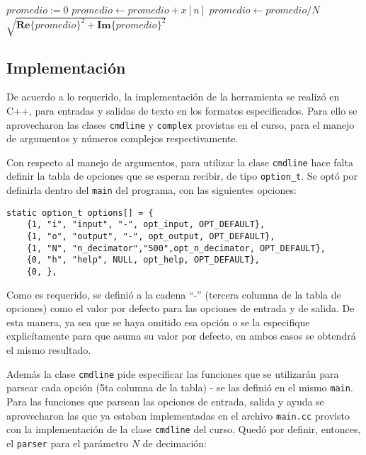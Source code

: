 	\begin{algorithmic}[H] %

	
			\State $promedio := 0$
				\State $promedio \gets promedio + x[n]$
			\EndFor
			\State $promedio \gets promedio / N$
			\Return $\sqrt{\mathbf{Re}\{promedio\}^2 + \mathbf{Im}\{promedio\}^2}$ 
		\EndWhile
	\end{algorithmic}

\newpage

\subsection{Implementación}
 De acuerdo a lo requerido, la implementación de la herramienta se realizó en C++, para entradas y salidas de texto en los formatos especificados. Para ello se aprovecharon las clases \texttt{cmdline} y \texttt{complex} provistas en el curso, para el manejo de argumentos y números complejos respectivamente.

 Con respecto al manejo de argumentos, para utilizar la clase \texttt{cmdline} hace falta definir la tabla de opciones que se esperan recibir, de tipo \texttt{option\_t}. Se optó por definirla dentro del \texttt{main} del programa, con las siguientes opciones:

\lstset{language=C++}
\begin{lstlisting}[frame=single]
static option_t options[] = {
	{1, "i", "input", "-", opt_input, OPT_DEFAULT},
	{1, "o", "output", "-", opt_output, OPT_DEFAULT},
	{1, "N", "n_decimator","500",opt_n_decimator, OPT_DEFAULT},
	{0, "h", "help", NULL, opt_help, OPT_DEFAULT},
	{0, },
\end{lstlisting}

Como es requerido, se definió a la cadena ``-'' (tercera columna de la tabla de opciones) como el valor por defecto para las opciones de entrada y de salida. De esta manera, ya sea que se haya omitido esa opción o se la especifique explicítamente para que asuma su valor por defecto, en ambos casos se  obtendrá el mismo resultado.

Además la clase \texttt{cmdline} pide especificar las funciones que se utilizarán para parsear cada opción (5ta columna de la tabla) - se las definió en el mismo \texttt{main}. Para las funciones que parsean las opciones de entrada, salida y ayuda se aprovecharon las que ya estaban implementadas en el archivo \texttt{main.cc} provisto con la implementación de la clase \texttt{cmdline} del curso. Quedó por definir, entonces, el \texttt{parser} para el parámetro $N$ de decimación:


